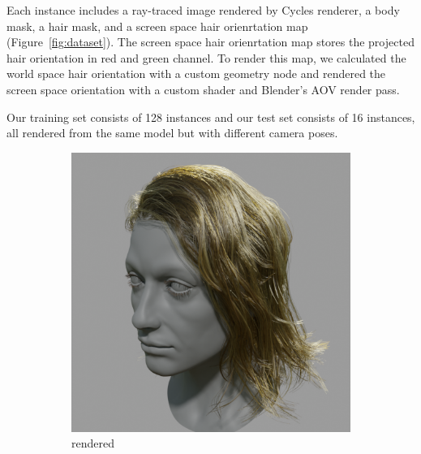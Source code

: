 \documentclass{article}
\begin{document}
Each instance includes a ray-traced image rendered by Cycles renderer, a body mask, a hair mask, and a screen space hair orienrtation map (Figure~\ref{fig:dataset}). The screen space hair orienrtation map stores the projected hair orientation in red and green channel. To render this map, we calculated the world space hair orientation with a custom geometry node and rendered the screen space orientation with a custom shader and Blender's AOV render pass.

Our training set consists of 128 instances and our test set consists of 16 instances, all rendered from the same model but with different camera poses.

\begin{figure}[h]
	\centering
	\begin{subfigure}{0.24\linewidth}
		\centering
		\includegraphics[width=\textwidth]{./images/dataset/0009_rendered.png}
		\caption{rendered}
	\end{subfigure}
	\hfill
	\begin{subfigure}{0.24\linewidth}
		\centering

\end{subfigure}
\end{figure}
\end{document}

